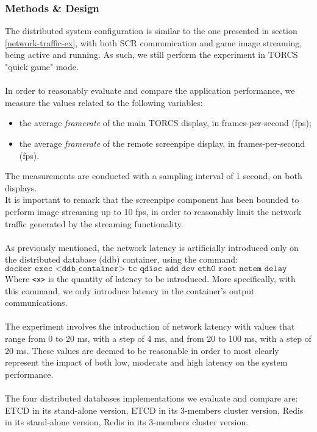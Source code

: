 \subsubsection{Methods \& Design}
The distributed system configuration is similar to the one presented in section \ref{network-traffic-ex}, with both SCR communication and game image streaming, being active and running. As such, we still perform the experiment in TORCS "quick game" mode. \\ \\
In order to reasonably evaluate and compare the application performance, we measure the values related to  the following variables:
\begin{itemize}
	\item the average \textit{framerate} of the main TORCS display, in frames-per-second (fps);
	\item the average \textit{framerate} of the remote screenpipe display, in frames-per-second (fps).
\end{itemize}
The measurements are conducted with a sampling interval of 1 second, on both displays. \\
It is important to remark that the screenpipe component has been bounded to perform image streaming up to 10 fps, in order to reasonably limit the network traffic generated by the streaming functionality. \\ \\
As previously mentioned, the network latency is artificially introduced only on the distributed database (ddb) container, using the command: \[\texttt{docker exec <ddb\_container> tc qdisc add dev eth0 root netem delay <x>ms}\]
Where \texttt{<x>} is the quantity of latency to be introduced. More specifically, with this command, we only introduce latency in the container's output communications. \\ \\
The experiment involves the introduction of network latency with values that range from 0 to 20 ms, with a step of 4 ms, and from 20 to 100 ms, with a step of 20 ms. These values are deemed to be reasonable in order to most clearly represent the impact of both low, moderate and high latency on the system performance. \\ \\
The four distributed databases implementations we evaluate and compare are: ETCD in its stand-alone version, ETCD in its 3-members cluster version, Redis in its stand-alone version, Redis in its 3-members cluster version.

